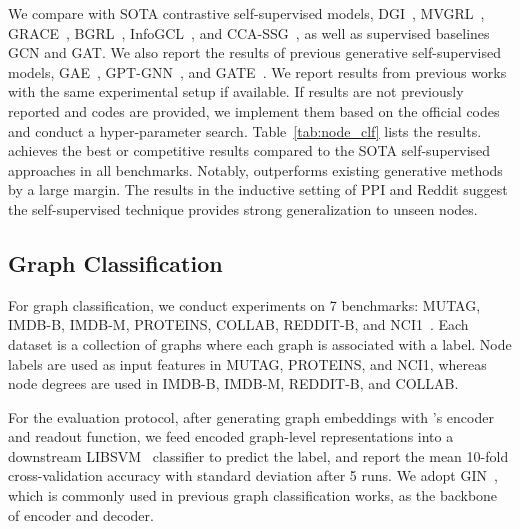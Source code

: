 We compare  \model with SOTA  contrastive self-supervised models, DGI~\cite{velivckovic2018deep}, MVGRL~\cite{hassani2020contrastive}, GRACE~\cite{zhu2020deep}, BGRL~\cite{thakoor2021bootstrapped}, InfoGCL~\cite{Xu2021InfoGCLIG}, and CCA-SSG~\cite{zhang2021canonical}, as well as supervised baselines GCN and GAT. 
We also report the results of previous generative self-supervised models, GAE~\cite{kipf2016variational}, GPT-GNN~\cite{hu2020gpt}, and GATE~\cite{amin2020gate}.
We report results from previous works with the same experimental setup if available.
If results are not previously reported and codes are provided, we implement them based on the official codes and conduct a hyper-parameter search. 
Table~\ref{tab:node_clf} lists the results. 
\model achieves the best or competitive results compared to the SOTA self-supervised approaches in all benchmarks. 
Notably, \model outperforms existing generative methods by a large margin. 
The results in the inductive setting of PPI and Reddit suggest the self-supervised \model technique provides strong generalization to unseen nodes. 









\subsection{Graph Classification}


For graph classification,  we conduct experiments on 7 benchmarks: MUTAG, IMDB-B, IMDB-M, PROTEINS, COLLAB, REDDIT-B, and NCI1~\cite{yanardag2015deep}.
Each dataset is a collection of graphs where each graph is associated with a label.
Node labels are used as input features in MUTAG, PROTEINS, and NCI1, whereas node degrees are used in IMDB-B, IMDB-M, REDDIT-B, and COLLAB.

For the evaluation protocol, after generating graph embeddings with \model's encoder and readout function, we feed encoded graph-level representations into a downstream LIBSVM~\cite{chang2011libsvm} classifier to predict the label, and report the mean 10-fold cross-validation accuracy with standard deviation after 5 runs.  We adopt GIN~\cite{xu2019powerful}, which is commonly used in previous graph classification works, as the backbone of encoder and decoder.


